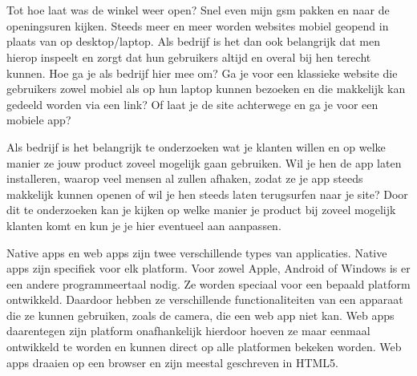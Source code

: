 



\chapter*{}

Tot hoe laat was de winkel weer open? Snel even mijn gsm pakken en naar de openingsuren kijken. Steeds meer en meer worden websites mobiel geopend in plaats van op desktop/laptop. Als bedrijf is het dan ook belangrijk dat men hierop inspeelt en zorgt dat hun gebruikers altijd en overal bij hen terecht kunnen.
Hoe ga je als bedrijf hier mee om? Ga je voor een klassieke website die gebruikers zowel mobiel als op hun laptop kunnen bezoeken en die makkelijk kan gedeeld worden via een link? Of laat je de site achterwege en ga je voor een mobiele app? 

Als bedrijf is het belangrijk te onderzoeken wat je klanten willen en op welke manier ze jouw product zoveel mogelijk gaan gebruiken. Wil je hen de app laten installeren, waarop veel mensen al zullen afhaken, zodat ze je app steeds makkelijk kunnen openen of wil je hen steeds laten terugsurfen naar je site? Door dit te onderzoeken kan je kijken op welke manier je product bij zoveel mogelijk klanten komt en kun je je hier eventueel aan aanpassen. 

Native apps en web apps zijn twee verschillende types van applicaties. Native apps zijn specifiek voor elk platform. Voor zowel Apple, Android of Windows is er een andere programmeertaal nodig. Ze worden speciaal voor een bepaald platform ontwikkeld. Daardoor hebben ze verschillende functionaliteiten van een apparaat die ze kunnen gebruiken, zoals de camera, die een web app niet kan. Web apps daarentegen zijn platform onafhankelijk hierdoor hoeven ze maar eenmaal ontwikkeld te worden en kunnen direct op alle platformen bekeken worden. Web apps draaien op een browser en zijn meestal geschreven in HTML5. 

